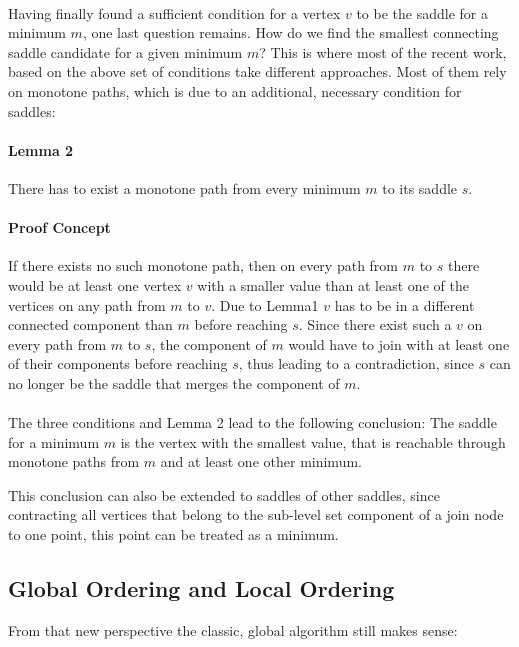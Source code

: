 \documentclass{scrartcl}
\begin{document}
\paragraph{}
Having finally found a sufficient condition for a vertex \(v\) to be the saddle for a minimum \(m\), one last question remains. How do we find the smallest connecting saddle candidate for a given minimum \(m\)? This is where most of the recent work, based on the above set of conditions take different approaches. Most of them rely on monotone paths, which is due to an additional, necessary condition for saddles:

\paragraph{Lemma 2} There has to exist a monotone path from every minimum \(m\) to its saddle \(s\). 

\paragraph{Proof Concept}
If there exists no such monotone path, then on every path from \(m\) to \(s\) there would be at least one vertex \(v\) with a smaller value than at least one of the vertices on any path from \(m\) to \(v\). Due to Lemma1 \(v\) has to be in a different connected component than \(m\) before reaching \(s\). Since there exist such a \(v\) on every path from \(m\) to \(s\), the component of \(m\) would have to join with at least one of their components before reaching \(s\), thus leading to a contradiction, since \(s\) can no longer be the saddle that merges the component of \(m\).  

\paragraph{}
The three conditions and Lemma 2 lead to the following conclusion: The saddle for a minimum \(m\) is the vertex with the smallest value, that is reachable through monotone paths from \(m\) and at least one other minimum. 

This conclusion can also be extended to saddles of other saddles, since contracting all vertices that belong to the sub-level set component of a join node to one point, this point can be treated as a minimum.

\subsection{Global Ordering and Local Ordering}
From that new perspective the classic, global algorithm \cite{orig} still makes sense: 
\end{document}
